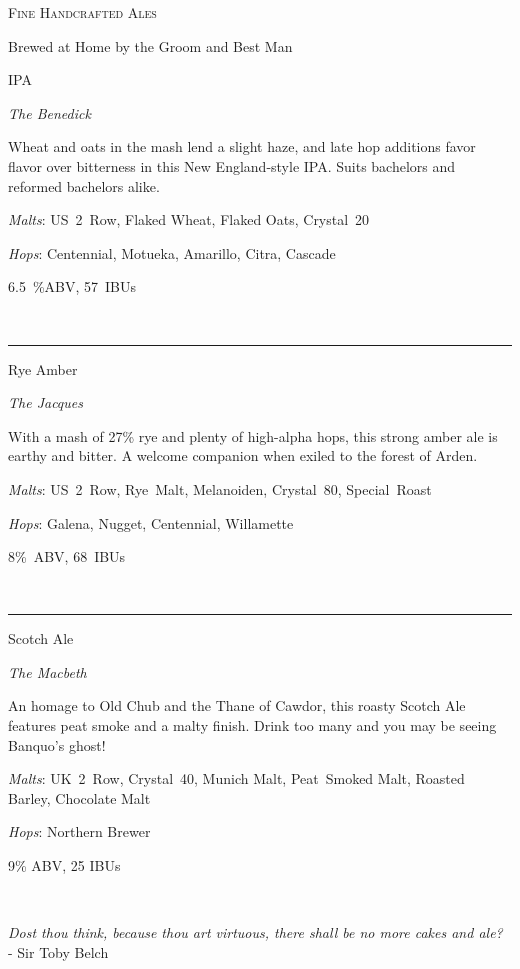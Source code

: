 \documentclass[12pt]{article}
\newcommand{\setbrew}[6]{
\begin{minipage}[t]{0.30\textwidth}
\begin{center}
  {\huge #1}

  \medskip
  
  {\Large \textit{#2}}

\medskip
  
{\large #3

  \medskip

  \textit{Malts}: #4
  
  \smallskip
  
  \textit{Hops}: #5
  
  \medskip
  
  #6
}\ 
\end{center}
\end{minipage}
}
\newcommand{\brewrule}{
  \hspace*{\fill} \rule[-9.5cm]{1pt}{10cm} \hspace*{\fill}
}
\begin{document}
\begin{center}

{\Huge \scshape Fine Handcrafted Ales }

\bigskip

{\Large Brewed at Home by the Groom and Best Man}


\setbrew{IPA}
{The Benedick}
{
Wheat and oats in
the mash lend a slight haze, and late hop additions favor flavor over
bitterness in this New England-style IPA.
Suits bachelors and reformed bachelors alike.
}
{US~2~Row, Flaked Wheat, Flaked Oats, Crystal~20}
{Centennial, Motueka, Amarillo, Citra, Cascade}
{6.5~\%ABV, 57~IBUs}
%
\brewrule
\setbrew{Rye Amber}{The Jacques}
{
  With a mash of 27\% rye and plenty of high-alpha hops, this strong
  amber ale is earthy and bitter.
  A welcome companion when exiled to the forest of Arden.
}
{ US~2~Row, Rye~Malt, Melanoiden, Crystal~80, Special~Roast }
{ Galena, Nugget, Centennial, Willamette }
{ 8\%~ABV, 68~IBUs }
%
\brewrule
\setbrew{Scotch Ale}{The Macbeth}
{
  An homage to Old Chub and the Thane of Cawdor, this roasty 
  Scotch Ale features peat smoke and a malty finish.
  Drink too many and you may be seeing Banquo's ghost!
}
{ UK~2~Row, Crystal~40, Munich Malt, Peat~Smoked Malt, Roasted
  Barley, Chocolate Malt
}
{ Northern Brewer }
{ 9\% ABV, 25 IBUs }


{\large
\textit{Dost thou think, because thou art 
  virtuous, there shall be no more cakes and ale?} \\
- Sir Toby Belch
}

\end{center}
\end{document}
